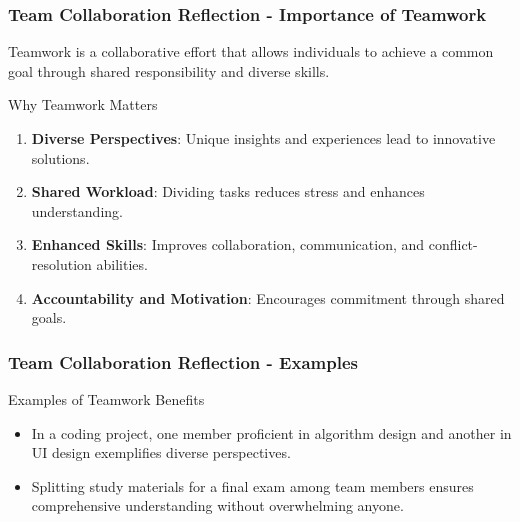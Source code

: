 \documentclass{beamer}
\begin{document}
\begin{frame}[fragile]
    \frametitle{Team Collaboration Reflection - Importance of Teamwork}
    Teamwork is a collaborative effort that allows individuals to achieve a common goal through shared responsibility and diverse skills. 

    \begin{block}{Why Teamwork Matters}
        \begin{enumerate}
            \item \textbf{Diverse Perspectives}: Unique insights and experiences lead to innovative solutions.
            \item \textbf{Shared Workload}: Dividing tasks reduces stress and enhances understanding.
            \item \textbf{Enhanced Skills}: Improves collaboration, communication, and conflict-resolution abilities.
            \item \textbf{Accountability and Motivation}: Encourages commitment through shared goals.
        \end{enumerate}
    \end{block}
\end{frame}

\begin{frame}[fragile]
    \frametitle{Team Collaboration Reflection - Examples}
    \begin{block}{Examples of Teamwork Benefits}
        \begin{itemize}
            \item In a coding project, one member proficient in algorithm design and another in UI design exemplifies diverse perspectives.
            \item Splitting study materials for a final exam among team members ensures comprehensive understanding without overwhelming anyone.
        \end{itemize}
    \end{block}
\end{frame}
\end{document}
